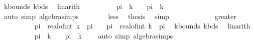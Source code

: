 \begin{isabellebody}
\ kbounds{\isacharparenleft}{\kern0pt}{}{\isacharparenright}{\kern0pt}\ k{\isacharprime}{\kern0pt}bds{\isacharparenleft}{\kern0pt}{}{\isacharparenright}{\kern0pt}\ \isamarkupfalse%
\ linarith\isanewline
\ \ \ \ \ \ \isamarkupfalse%
\ {\isachardoublequoteopen}{}\ {\isacharasterisk}{\kern0pt}\ pi\ {\isacharasterisk}{\kern0pt}\ k\ {\isacharless}{\kern0pt}\ {}\ {\isacharasterisk}{\kern0pt}\ pi\ {\isacharasterisk}{\kern0pt}\ {\isacharparenleft}{\kern0pt}k{\isacharprime}{\kern0pt}\ {\isacharplus}{\kern0pt}\ {}{\isacharparenright}{\kern0pt}{\isachardoublequoteclose}\ \isamarkupfalse%
\ {\isacharparenleft}{\kern0pt}auto\ simp{\isacharcolon}{\kern0pt}\ algebra{\isacharunderscore}{\kern0pt}simps{\isacharparenright}{\kern0pt}\isanewline
\ \ \ \ \ \ \isamarkupfalse%
\ less\ \isamarkupfalse%
\ {\isacharquery}{\kern0pt}thesis\ \isamarkupfalse%
\ simp\isanewline
\ \ \ \ \isamarkupfalse%
\isanewline
\ \ \ \ \ \ \isamarkupfalse%
\ greater\isanewline
\ \ \ \ \ \ \isamarkupfalse%
\ {\isachardoublequoteopen}{}\ {\isacharasterisk}{\kern0pt}\ pi\ {\isacharasterisk}{\kern0pt}\ real{\isacharunderscore}{\kern0pt}of{\isacharunderscore}{\kern0pt}int\ k{\isacharprime}{\kern0pt}\ {\isacharminus}{\kern0pt}\ pi\ {\isacharless}{\kern0pt}\ {}\ {\isacharasterisk}{\kern0pt}\ pi\ {\isacharasterisk}{\kern0pt}\ real{\isacharunderscore}{\kern0pt}of{\isacharunderscore}{\kern0pt}int\ k\ {\isacharplus}{\kern0pt}\ pi{\isachardoublequoteclose}\ \isamarkupfalse%
\ kbounds{\isacharparenleft}{\kern0pt}{}{\isacharparenright}{\kern0pt}\ k{\isacharprime}{\kern0pt}bds{\isacharparenleft}{\kern0pt}{}{\isacharparenright}{\kern0pt}\ \isamarkupfalse%
\ linarith\isanewline
\ \ \ \ \ \ \isamarkupfalse%
\ {\isachardoublequoteopen}{}\ {\isacharasterisk}{\kern0pt}\ pi\ {\isacharasterisk}{\kern0pt}\ k{\isacharprime}{\kern0pt}\ {\isacharless}{\kern0pt}\ {}\ {\isacharasterisk}{\kern0pt}\ pi\ {\isacharasterisk}{\kern0pt}\ {\isacharparenleft}{\kern0pt}k\ {\isacharplus}{\kern0pt}\ {}{\isacharparenright}{\kern0pt}{\isachardoublequoteclose}\ \isamarkupfalse%
\ {\isacharparenleft}{\kern0pt}auto\ simp{\isacharcolon}{\kern0pt}\ algebra{\isacharunderscore}{\kern0pt}simps{\isacharparenright}{\kern0pt}\isanewline
\ \ \ \ \ \ \isamarkupfalse%

\end{isabellebody}
